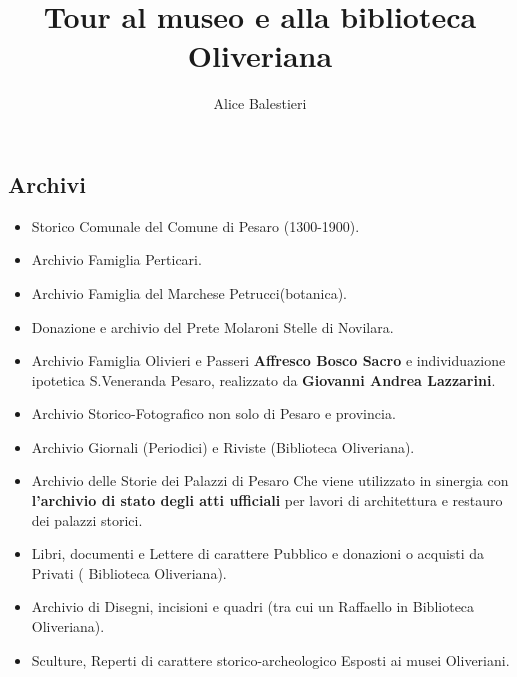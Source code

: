 \documentclass[hidelinks,12pt,a4paper]{article}
\begin{document}
	\begin{flushleft}
		
		\title{\textbf{Tour al museo e alla biblioteca Oliveriana}}
		\author{Alice Balestieri}
		\date{}
		
		\maketitle
		\setcounter{page}{1}
		\newpage
		
		\tableofcontents
		\newpage
		
		\section{Archivi}
		
		\begin{itemize}
			\item Storico Comunale del Comune di Pesaro (1300-1900).
			\item Archivio Famiglia Perticari.
			\item Archivio Famiglia del Marchese Petrucci(botanica).
			\item Donazione e archivio del Prete Molaroni \textrightarrow Stelle di Novilara.
			\item Archivio Famiglia Olivieri e Passeri \textrightarrow \textbf{Affresco Bosco Sacro} e individuazione ipotetica S.Veneranda Pesaro, realizzato da \textbf{Giovanni Andrea Lazzarini}.
			\item Archivio Storico-Fotografico non solo di Pesaro e provincia.
			\item Archivio Giornali (Periodici) e Riviste (Biblioteca Oliveriana).
			\item Archivio delle Storie dei Palazzi di Pesaro \textrightarrow Che viene utilizzato in sinergia con \textbf{l'archivio di stato degli atti ufficiali} per lavori di architettura e restauro dei palazzi storici.
			\item Libri, documenti e Lettere di carattere Pubblico e donazioni o acquisti da Privati ( Biblioteca Oliveriana).
			\item Archivio di Disegni, incisioni e quadri (tra cui un Raffaello in Biblioteca Oliveriana).
			\item Sculture, Reperti di carattere storico-archeologico \textrightarrow Esposti ai musei Oliveriani.			
		\end{itemize}
	

\end{flushleft}
\end{document}
